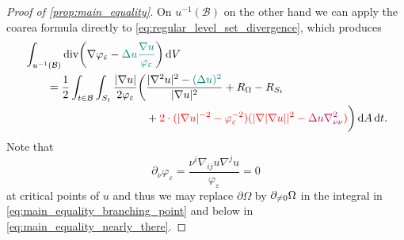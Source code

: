 \documentclass[draft]{amsart}
\newcommand*{\mathfullstop}{.}
\DeclarePairedDelimiter{\parens}{(}{)}
\let\p\parens %
\newcommand*{\laplacian}{\Delta}
\newcommand*{\boundary}{\partial}
\DeclareMathOperator{\divergence}{div}
\DeclarePairedDelimiter{\abs}{\lvert}{\rvert} %
\newcommand{\inverse}[1]{{#1}^{-1}}
\begin{document}
\begin{proof}[Proof of \cref{prop:main_equality}]
    On \( \inverse{u}(\mathcal{B}) \) on the other hand we can apply the coarea formula directly to \cref{eq:regular_level_set_divergence}, which produces
    \begin{equation}
        \begin{aligned}            
            &\int_{\inverse{u}(\mathcal{B})}\divergence\p*{\nabla \varphi_{\varepsilon}-\nonHarmonic{\laplacian u \frac{\nabla u}{\varphi_{\varepsilon}}}}\odif{V}\\
            &\qquad=\frac{1}{2}\int_{t\in \mathcal{B}}\int_{S_t}\frac{\abs{\nabla u}}{2\varphi_{\varepsilon}}\begin{aligned}[t]
                \biggl(&\frac{\abs{\nabla^2 u}^2-\nonHarmonic{(\laplacian u)^2}}{\abs{\nabla u}^2}+R_{\Omega}-R_{S_t}\\
                &+\additionalTerms{2\cdot (\abs{\nabla u}^{-2}-\varphi_{\varepsilon}^{-2})(\abs{\nabla \abs{\nabla u}}^2 -\additionalNonHarmonicTerms{\laplacian u \nabla^2_{\nu \nu}})}\biggr)\odif{A}\odif{t}\mathfullstop
            \end{aligned}\label{eq:away_from_critical_points}
        \end{aligned}
    \end{equation}
    Note that 
    \begin{equation*}
        \partial_\nu \varphi_\varepsilon=\frac{\nu^i \nabla_{ij}u \nabla^j u}{\varphi_\varepsilon}=0
    \end{equation*} 
    at critical points of \( u \) and thus we may replace \( \boundary{\Omega} \) by \( \partial_{\neq 0}\Omega \) in the integral in \cref{eq:main_equality_branching_point} and below in \cref{eq:main_equality_nearly_there}. 
    

\end{proof}
\end{document}
